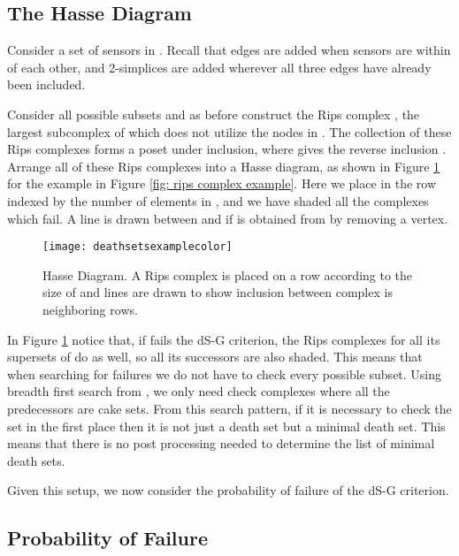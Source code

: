 \documentclass[10pt,twocolumn]{article} \usepackage{amsmath,epsf,amssymb,cite,pifont,amsthm, mathrsfs,epsfig,  bbm, amsthm,  setspace}
\renewcommand{\1}{\mathbbm{1}}
\begin{document}
\subsection{The Hasse Diagram}\label{S: Hasse}

Consider a set of sensors  in .
Recall that edges are added when  sensors are within  of each other,
and 2-simplices are added wherever all three edges have already been included.

Consider all possible subsets  and
as before construct the Rips complex ,
the largest subcomplex of  which does not utilize the nodes in .
The collection of  these Rips complexes forms a poset under inclusion,
where  gives the reverse inclusion .
Arrange all of these Rips complexes into a Hasse diagram,
as shown in Figure \ref{fig: Inclusion Diagram} for the example in
Figure \ref{fig: rips complex example}.
Here we place  in the row indexed by the number of elements in ,
and we have shaded all the complexes  which fail.
A line is drawn between  and  if  is obtained from 
by removing a vertex.

\begin{figure}[h]
\begin{center}
\texttt{[image: deathsetsexamplecolor]}
\end{center}
\caption{Hasse Diagram.  A Rips complex  is placed on a row according to the size of  and lines are drawn to show inclusion between complex is neighboring rows.}\label{fig: Inclusion Diagram}
\end{figure}

In Figure \ref{fig: Inclusion Diagram} notice that, if  fails the dS-G criterion, the Rips
complexes for all its supersets of  do as well, so all its successors are also shaded.
This means that when searching for failures we do not have to check every possible subset.
Using breadth first search from , we only need check complexes where all the predecessors are cake sets.
From this search pattern, if it is necessary to check the set in the first place
then it is not just a death set but a minimal death set.
This means that there is no post processing needed to determine the list of minimal death sets.

Given this setup, we now consider the probability of failure of the dS-G criterion.


\subsection{Probability of Failure} \label{S: Probability of Failure}
\end{document}
